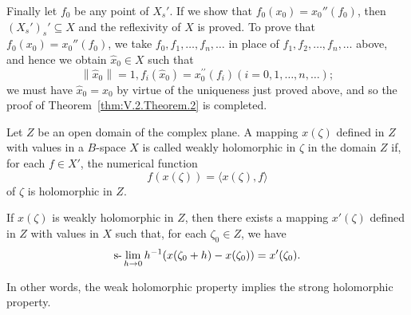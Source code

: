 Finally let $f_0$ be any point of $X_s'$. If we show that $f_0(x_0) = x_0''(f_0)$, then $(X_s')_s' \subseteq X$ and the reflexivity of $X$ is proved. To prove that $f_0(x_0) = x_0''(f_0)$, we take $f_0, f_1, \ldots, f_n, \ldots$ in place of $f_1, f_2, \ldots, f_n, \ldots$ above, and hence we obtain $\hat{x}_0 \in X$ such that 
\[
\left\| \hat {x} _{0} \right\| = 1, f _{i} (\hat {x} _{0}) = x _{0} ^{\prime \prime} (f _{i}) (i = 0, 1, \dots , n, \dots);
\]
we must have $\hat{x}_{0}=x_{0}$ by virtue of the uniqueness just proved above, and so the proof of Theorem~\ref{thm:V.2.Theorem.2} is completed. 


\label{sec:V.3}

\begin{definition}\label{def:V.3.Definition.1} Let $Z$ be an open domain of the complex plane. A mapping $x(\zeta)$ defined in $Z$ with values in a $B$-space $X$ is called weakly holomorphic in $\zeta$ in the domain $Z$ if, for each $f \in X'$, the numerical function 
\[
f (x (\zeta)) = \langle x (\zeta), f \rangle
\]
of $\zeta$ is holomorphic in $Z$. 
\end{definition}

\begin{theorem}\label{thm:V.3.Theorem.1} If $x(\zeta)$ is weakly holomorphic in $Z$, then there exists a mapping $x'(\zeta)$ defined in $Z$ with values in $X$ such that, for each $\zeta_0 \in Z$, we have 
\[
\text{s-}\lim _{h \to 0} h ^{-1} (x (\zeta_{0} + h) - x (\zeta_{0})) = x ^{\prime} (\zeta_{0}).
\]
\end{theorem}

In other words, the weak holomorphic property implies the strong holomorphic property. 

